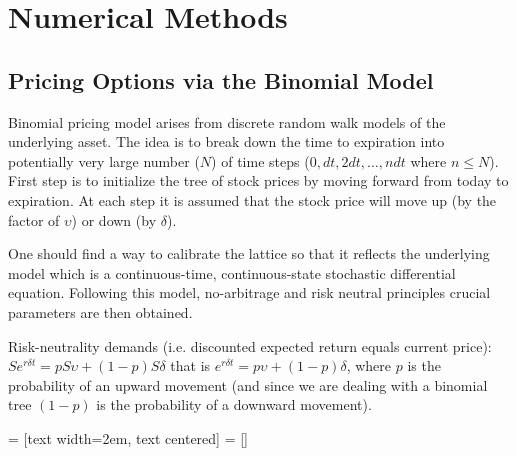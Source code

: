 \chapter{Numerical Methods}
\label{ch:numerical_approx}

\section{Pricing Options via the Binomial Model}

Binomial pricing model arises from discrete random walk models of the underlying asset. The idea is to break down the time to expiration into potentially very large number ($N$) of time steps ($0, dt, 2dt,\ldots , ndt$ where $n\leq N$). First step is to initialize the tree of stock prices by moving forward from today to expiration. At each step it is assumed that the stock price will move up (by the factor of $\upsilon$) or down (by $\delta$).

One should find a way to calibrate the lattice so that it reflects the underlying model which is a continuous-time, continuous-state stochastic differential equation. Following this model, no-arbitrage and risk neutral principles crucial parameters are then obtained.

Risk-neutrality demands (i.e. discounted expected return equals current price): $Se^{r\delta t} = pS\upsilon + (1-p)S\delta$ that is $e^{r\delta t} = p\upsilon + (1-p)\delta$, where $p$ is the probability of an upward movement (and since we are dealing with a binomial tree $(1-p)$ is the probability of a downward movement). 

 = [text width=2em, text centered]
 = []

